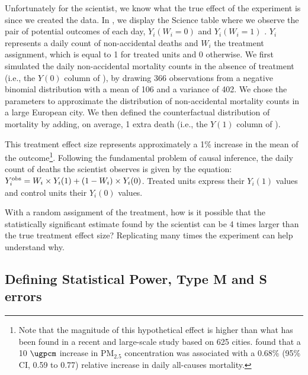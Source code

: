 \documentclass[12pt]{article}
\renewcommand{\thefootnote}{\fnsymbol{footnote}}
\begin{document}
    Unfortunately for the scientist, we know what the true effect of the experiment is since we created the data. In , we display the Science table where we observe the pair of potential outcomes of each day, $Y_{i}(W_{i}=0)$ and $Y_{i}(W_{i}=1)$ \citep{rubin_estimating_1974}. $Y_{i}$ represents a daily count of non-accidental deaths and $W_{i}$ the treatment assignment, which is equal to 1 for treated units and 0 otherwise. We first simulated the daily non-accidental mortality counts in the absence of treatment (i.e., the $Y(0)$ column of ), by drawing 366 observations from a negative binomial distribution with a mean of 106 and a variance of 402. We chose the parameters to approximate the distribution of non-accidental mortality counts in a large European city. We then defined the counterfactual distribution of mortality by adding, on average, 1 extra death (i.e., the $Y(1)$ column of ). 
    
            
            
    \renewcommand*{\thefootnote}{\arabic{footnote}}
    \setcounter{footnote}{0}

    \noindent This treatment effect size represents approximately a 1\% increase in the mean of the outcome\footnote{Note that the magnitude of this hypothetical effect is higher than what has been found in a recent and large-scale study based on 625 cities. \cite{liu_ambient_2019} found that a 10 $\si{\ugpcm}$ increase in $\text{PM}_{2.5}$ concentration was associated with a 0.68\% (95\% CI, 0.59 to 0.77) relative increase in daily all-causes mortality.}. Following the fundamental problem of causal inference, the daily count of deaths the scientist observes is given by the equation: $Y_{i}^{\textnormal{obs}} = W_{i} \times Y_{i}(1) + (1-W_{i})\times Y_{i}(0)$. Treated units express their $Y_{i}(1)$ values and control units their $Y_{i}(0)$ values. 
    
    With a random assignment of the treatment, how is it possible that the statistically significant estimate found by the scientist can be 4 times larger than the true treatment effect size? Replicating many times the experiment can help understand why.
        
    \subsection{Defining Statistical Power, Type M and S errors}
\end{document}
